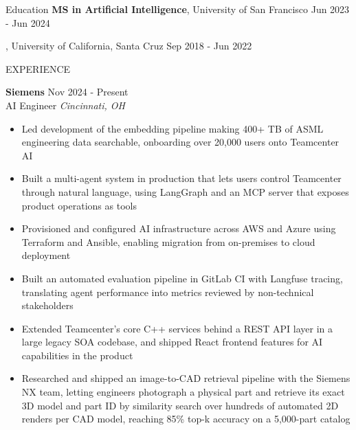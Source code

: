 \documentclass{resume} %
\begin{document}
\begin{rSection}{Education}
    {\bf MS in Artificial Intelligence}, University of San Francisco \hfill {Jun 2023 - Jun 2024}

    , University of California, Santa Cruz \hfill {Sep 2018 - Jun 2022}
\end{rSection}

\begin{rSection}{EXPERIENCE}

    \textbf{Siemens} \hfill Nov 2024 - Present\\
    AI Engineer \hfill \textit{Cincinnati, OH}
     \begin{itemize}
        \item Led development of the embedding pipeline making 400+ TB of ASML engineering data searchable, onboarding over 20,000 users onto Teamcenter AI
        \item Built a multi-agent system in production that lets users control Teamcenter through natural language, using LangGraph and an MCP server that exposes product operations as tools
        \item Provisioned and configured AI infrastructure across AWS and Azure using Terraform and Ansible, enabling migration from on-premises to cloud deployment
        \item Built an automated evaluation pipeline in GitLab CI with Langfuse tracing, translating agent performance into metrics reviewed by non-technical stakeholders
        \item Extended Teamcenter's core C++ services behind a REST API layer in a large legacy SOA codebase, and shipped React frontend features for AI capabilities in the product
        \item Researched and shipped an image-to-CAD retrieval pipeline with the Siemens NX team, letting engineers photograph a physical part and retrieve its exact 3D model and part ID by similarity search over hundreds of automated 2D renders per CAD model, reaching 85\% top-k accuracy on a 5,000-part catalog
     \end{itemize}


\end{rSection}
\end{document}

